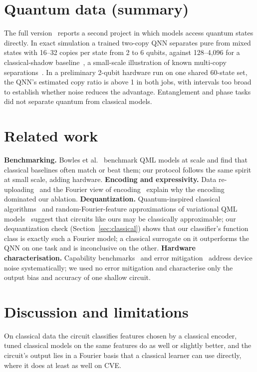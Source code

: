\documentclass[11pt]{article}
\begin{document}
\section{Quantum data (summary)}\label{sec:quantum}
The full version~\cite{reddy2026full} reports a second project in which models access quantum states directly. In exact simulation a trained two-copy QNN separates pure from mixed states with 16--32 copies per state from 2 to 6 qubits, against 128--4{,}096 for a classical-shadow baseline~\cite{huang2020shadows}, a small-scale illustration of known multi-copy separations~\cite{huang2022experiments,chen2021memory}. In a preliminary 2-qubit hardware run on one shared 60-state set, the QNN's estimated copy ratio is above 1 in both jobs, with intervals too broad to establish whether noise reduces the advantage. Entanglement and phase tasks did not separate quantum from classical models.

\section{Related work}
\textbf{Benchmarking.} Bowles et al.~\cite{bowles2024better} benchmark QML models at scale and find that classical baselines often match or beat them; our protocol follows the same spirit at small scale, adding hardware. \textbf{Encoding and expressivity.} Data re-uploading~\cite{perezsalinas2020reuploading} and the Fourier view of encoding~\cite{schuld2021encoding} explain why the encoding dominated our ablation. \textbf{Dequantization.} Quantum-inspired classical algorithms~\cite{tang2019dequantized} and random-Fourier-feature approximations of variational QML models~\cite{landman2022rff} suggest that circuits like ours may be classically approximable; our dequantization check (Section~\ref{sec:classical}) shows that our classifier's function class is exactly such a Fourier model; a classical surrogate on it outperforms the QNN on one task and is inconclusive on the other. \textbf{Hardware characterisation.} Capability benchmarks~\cite{proctor2022capabilities} and error mitigation~\cite{temme2017mitigation} address device noise systematically; we used no error mitigation and characterise only the output bias and accuracy of one shallow circuit.


\section{Discussion and limitations}
On classical data the circuit classifies features chosen by a classical encoder, tuned classical models on the same features do as well or slightly better, and the circuit's output lies in a Fourier basis that a classical learner can use directly, where it does at least as well on CVE.
\end{document}

